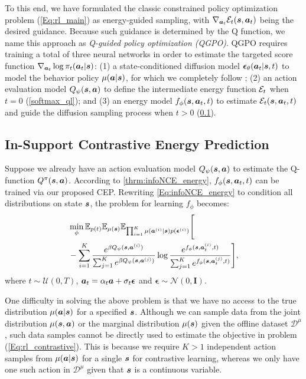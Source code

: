 To this end, we have formulated the classic constrained policy optimization problem (\ref{Eq:rl_main}) as energy-guided sampling, with $\nabla_{{\bm{a}}_t}{\mathcal{E}}_t({\bm{s}}, {\bm{a}}_t)$ being the desired guidance. Because such guidance is determined by the Q function, we name this approach as \textit{Q-guided policy optimization (QGPO)}. 
QGPO requires training a total of three neural networks in order to estimate the targeted score function $\nabla_{{\bm{a}}_t}\log \pi_t({\bm{a}}_t|{\bm{s}})$: (1) a state-conditioned diffusion model $\bm{\epsilon}_\theta({\bm{a}}_t| {\bm{s}}, t)$ to model the behavior policy $\mu({\bm{a}}|{\bm{s}})$, for which we completely follow \citet{sfbc}; (2) an action evaluation model $Q_\psi({\bm{s}}, {\bm{a}})$ to define the intermediate energy function ${\mathcal{E}}_t$ when $t=0$ (\cref{softmax_ql}); and (3) an energy model $f_\phi({\bm{s}}, {\bm{a}}_t, t)$ to estimate ${\mathcal{E}}_t({\bm{s}}, {\bm{a}}_t, t)$ and guide the diffusion sampling process when $t>0$ (\cref{sec:rl_method}).



\subsection{In-Support Contrastive Energy Prediction}
\label{sec:rl_method}
Suppose we already have an action evaluation model $Q_\psi({\bm{s}}, {\bm{a}})$ to estimate the Q-function $Q^{\pi}({\bm{s}}, {\bm{a}})$. According to \cref{thrm:infoNCE_energy}, $f_\phi({\bm{s}}, {\bm{a}}_t, t)$ can be trained via our proposed CEP. Rewriting \eqref{Eq:infoNCE_energy} to condition all distributions on state ${\bm{s}}$, the problem for learning $f_\phi$ becomes:
\begin{equation}
\label{Eq:rl_contrastive}
\begin{split}
    &\min_\phi \mathbb{E}_{p(t)}\mathbb{E}_{\mu({\bm{s}})}\mathbb{E}_{\prod_{i=1}^K \mu({\bm{a}}^{(i)}|{\bm{s}})p(\bm{\epsilon}^{(i)})}\Bigg[\\
    &- \sum_{i=1}^K
    \frac{e^{\beta Q_\psi({\bm{s}}, {\bm{a}}^{(i)})}}{\sum_{j=1}^K e^{\beta Q_\psi({\bm{s}}, {\bm{a}}^{(j)})}}
    \log \frac{e^{f_\phi({\bm{s}}, {\bm{a}}_t^{(i)}, t)}}{\sum_{j=1}^K e^{f_\phi({\bm{s}}, {\bm{a}}_t^{(j)}, t)}}
\Bigg],
\end{split}
\end{equation}
where $t \sim \mathcal{U}(0,T)$, ${\bm{a}}_t = \alpha_t{\bm{a}}+\sigma_t\bm{\epsilon}$ and $\bm{\epsilon}\sim \mathcal{N}(0,\bm{I})$.




One difficulty in solving the above problem is that we have no access to the true distribution $\mu({\bm{a}}|{\bm{s}})$ for a specified ${\bm{s}}$. Although we can sample data from the joint distribution $\mu({\bm{s}}, {\bm{a}})$ or the marginal distribution $\mu({\bm{s}})$ given the offline dataset $\mathcal{D}^\mu$, such data samples cannot be directly used to estimate the objective in problem (\ref{Eq:rl_contrastive}). This is because we require $K>1$ independent action samples from $\mu({\bm{a}}|{\bm{s}})$ for a single ${\bm{s}}$ for contrastive learning, whereas we only have one such action in $\mathcal{D}^\mu$ given that ${\bm{s}}$ is a continuous variable.

